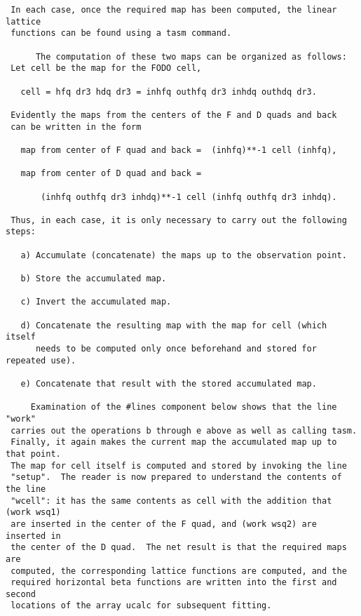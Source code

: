 \begin{footnotesize}
\begin{verbatim}
 In each case, once the required map has been computed, the linear lattice
 functions can be found using a tasm command.

      The computation of these two maps can be organized as follows:
 Let cell be the map for the FODO cell,

   cell = hfq dr3 hdq dr3 = inhfq outhfq dr3 inhdq outhdq dr3.

 Evidently the maps from the centers of the F and D quads and back
 can be written in the form

   map from center of F quad and back =  (inhfq)**-1 cell (inhfq),

   map from center of D quad and back =

       (inhfq outhfq dr3 inhdq)**-1 cell (inhfq outhfq dr3 inhdq).

 Thus, in each case, it is only necessary to carry out the following steps:

   a) Accumulate (concatenate) the maps up to the observation point.

   b) Store the accumulated map.

   c) Invert the accumulated map.

   d) Concatenate the resulting map with the map for cell (which itself
      needs to be computed only once beforehand and stored for repeated use).

   e) Concatenate that result with the stored accumulated map.

     Examination of the #lines component below shows that the line "work"
 carries out the operations b through e above as well as calling tasm.
 Finally, it again makes the current map the accumulated map up to that point.
 The map for cell itself is computed and stored by invoking the line
 "setup".  The reader is now prepared to understand the contents of the line
 "wcell": it has the same contents as cell with the addition that (work wsq1)
 are inserted in the center of the F quad, and (work wsq2) are inserted in
 the center of the D quad.  The net result is that the required maps are
 computed, the corresponding lattice functions are computed, and the
 required horizontal beta functions are written into the first and second
 locations of the array ucalc for subsequent fitting.


\end{verbatim}
\end{footnotesize}

